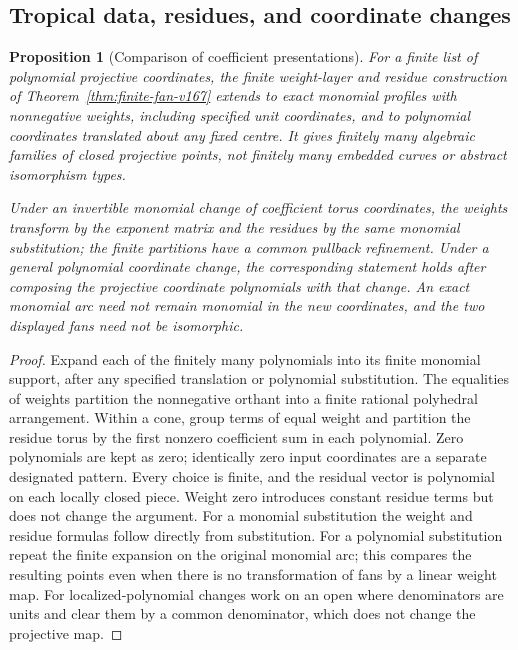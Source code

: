 \documentclass[11pt,reqno]{amsart}
\numberwithin{equation}{section}
\newtheorem{proposition}[theorem]{Proposition}
\theoremstyle{definition}\newtheorem{definition}[theorem]{Definition}
\theoremstyle{remark}\newtheorem{remark}[theorem]{Remark}
\begin{document}
\subsection{Tropical data, residues, and coordinate changes}
\begin{proposition}[Comparison of coefficient presentations]
\label{prop:fan-comparison-v169}
For a finite list of polynomial projective coordinates, the finite
weight-layer and residue construction of
Theorem~\ref{thm:finite-fan-v167} extends to exact monomial profiles
with nonnegative weights, including specified unit coordinates, and
to polynomial coordinates translated about any fixed centre. It gives
finitely many algebraic families of closed projective points, not
finitely many embedded curves or abstract isomorphism types.

Under an invertible monomial change of coefficient torus coordinates,
the weights transform by the exponent matrix and the residues by the
same monomial substitution; the finite partitions have a common
pullback refinement. Under a general polynomial coordinate change,
the corresponding statement holds after composing the projective
coordinate polynomials with that change. An exact monomial arc need
not remain monomial in the new coordinates, and the two displayed
fans need not be isomorphic.
\end{proposition}
\begin{proof}
Expand each of the finitely many polynomials into its finite monomial
support, after any specified translation or polynomial substitution.
The equalities of weights partition the nonnegative orthant into a
finite rational polyhedral arrangement. Within a cone, group terms
of equal weight and partition the residue torus by the first nonzero
coefficient sum in each polynomial. Zero polynomials are kept as zero;
identically zero input coordinates are a separate designated pattern.
Every choice is finite, and the residual vector is polynomial on each
locally closed piece. Weight zero introduces constant residue terms
but does not change the argument. For a monomial substitution the
weight and residue formulas follow directly from substitution.
For a polynomial substitution repeat the finite expansion on the
original monomial arc; this compares the resulting points even when
there is no transformation of fans by a linear weight map. For
localized-polynomial changes work on an open where denominators are
units and clear them by a common denominator, which does not change
the projective map.
\end{proof}
\end{document}
